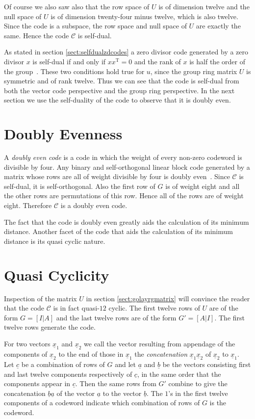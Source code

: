 Of course we also saw also that the row space of $U$ is of dimension twelve and the null space of $U$ is of dimension twenty-four minus twelve, which is also twelve.
Since the code is a subspace, the row space and null space of $U$ are exactly the same.
Hence the code $\mathcal{C}$ is self-dual.

As stated in section \ref{sect:selfdualzdcodes} a zero divisor code generated by a zero divisor $x$ is self-dual if and only if $xx^{\textrm{T}} = 0$ and the rank of $x$ is half the order of the group~\cite{hur09}.
These two conditions hold true for $u$, since the group ring matrix $U$ is symmetric and of rank twelve.
Thus we can see that the code is self-dual from both the vector code perspective and the group ring perspective.
In the next section we use the self-duality of the code to observe that it is doubly even.

\section{Doubly Evenness}
A \emph{doubly even code} is a code in which the weight of every non-zero codeword is divisible by four.
Any binary and self-orthogonal linear block code generated by a matrix whose rows are all of weight divisible by four is doubly even~\cite[p.~10]{huf03}.
Since $\mathcal{C}$ is self-dual, it is self-orthogonal.
Also the first row of $G$ is of weight eight and all the other rows are permutations of this row.
Hence all of the rows are of weight eight.
Therefore $\mathcal{C}$ is a doubly even code.

The fact that the code is doubly even greatly aids the calculation of its minimum distance.
Another facet of the code that aids the calculation of its minimum distance is its quasi cyclic nature.

\section{Quasi Cyclicity}
Inspection of the matrix $U$ in section \ref{sect:golayrgmatrix} will convince the reader that the code $\mathcal{C}$ is in fact quasi-$12$ cyclic.
The first twelve rows of $U$ are of the form $G=[I|A]$ and the last twelve rows are of the form $G'=[A|I]$.
The first twelve rows generate the code.

For two vectors $\underline{x}_1$ and $\underline{x}_2$ we call the vector resulting from appendage of the components of $\underline{x}_2$ to the end of those in $\underline{x}_1$ the \emph{concatenation} $\underline{x}_1 \underline{x}_2$ of $\underline{x}_2$ to $\underline{x}_1$.
Let $\underline{c}$ be a combination of rows of $G$ and let $\underline{a}$ and $\underline{b}$ be the vectors consisting first and last twelve components respectively of $\underline{c}$, in the same order that the components appear in $\underline{c}$.
Then the same rows from $G'$ combine to give the concatenation $\underline{b}\underline{a}$ of the vector $\underline{a}$ to the vector $\underline{b}$.
The $1$'s in the first twelve components of a codeword indicate which combination of rows of $G$ is the codeword.

